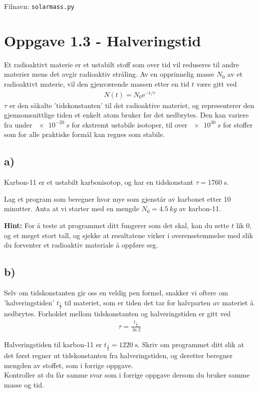 \documentclass[10pt,a4paper]{article}
\renewcommand{\exp}{\mathrm{e}^}
\newcommand{\halflife}{t_{\frac{1}{2}}}
\begin{document}
	
	Filnavn: \texttt{solarmass.py}
	
 
 
\section*{Oppgave 1.3 - Halveringstid}
Et radioaktivt materie er et ustabilt stoff som over tid vil reduseres til andre materier mens det avgir radioaktiv stråling. Av en opprinnelig masse $N_0$ av et radioaktivt materie, vil den gjenværende massen etter en tid $t$ være gitt ved
\begin{align}
N(t) = N_0\exp{-t/\tau}
\end{align}
$\tau$ er den såkalte 'tidskonstanten' til det radioaktive materiet, og representerer den gjennomsnittlige tiden et enkelt atom bruker før det nedbrytes. Den kan variere fra under $\SI{e-20}{s}$ for ekstremt ustabile isotoper, til over $\SI{e30}{s}$ for stoffer som for alle praktiske formål kan regnes som stabile.
 
 
\subsection*{a)}
Karbon-11 er et ustabilt karbonisotop, og har en tidskonstant $\tau = 1760\; \mathrm{s}$.
 
Lag et program som beregner hvor mye som gjenstår av karbonet etter 10 minutter. Anta at vi starter med en mengde $N_0 = \SI{4.5}{kg}$ av karbon-11.
 
\textbf{Hint:} For å teste at programmet ditt fungerer som det skal, kan du sette $t$ lik $0$, og et meget stort tall, og sjekke at resultatene virker i overensstemmelse med slik du forventer et radioaktiv materiale å oppføre seg.
 
 
\subsection*{b)}
Selv om tidskonstanten gir oss en veldig pen formel, snakker vi oftere om 'halveringstiden' $\halflife$ til materiet, som er tiden det tar for halvparten av materiet å nedbrytes. Forholdet mellom tidskonstanten og halveringstiden er gitt ved
\begin{align*}
\tau = \frac{\halflife}{\ln 2}
\end{align*}
 
Halveringstiden til karbon-11 er $\halflife = 1220\;\mathrm{s}$. Skriv om programmet ditt slik at det først regner ut tidskonstanten fra halveringstiden, og deretter beregner mengden av stoffet, som i forrige oppgave. \\
Kontroller at du får samme svar som i forrige oppgave dersom du bruker samme masse og tid.
 
\end{document}
